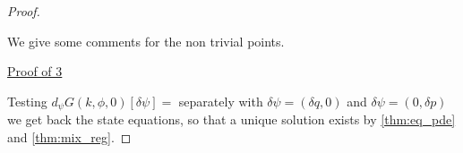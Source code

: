 \documentclass[english,a4paper,9pt,oneside]{scrbook}	%
\theoremstyle{break}
\newenvironment{mproof}[1][\proofname]{%
  \begin{proof}[#1]$ $\par\nobreak\ignorespaces
}{%
  \end{proof}
}
\renewcommand*{\proofname}{Proof}
\theoremstyle{remark}
\newcommand{\mR}{\mathbb{R}}
\newcommand{\norm}[1]{\left\lVert#1\right\rVert}
\newcommand{\tr}{\text{tr}}
\newcommand{\tw}[1]{\texttt{#1}}
\begin{document}
\begin{mproof}

We give some comments for the non trivial points.

%
%
%
%
%
%

\underline{Proof of 3}

Testing $d_\psi G(k,\phi,0)[\delta \psi]=$ separately with $\delta \psi =(\delta q, 0)$ and $\delta \psi = (0,\delta p)$ we get back the state equations, so that a unique solution exists by \cref{thm:eq_pde} and \cref{thm:mix_reg}.
%
%


\end{mproof}
\end{document}
